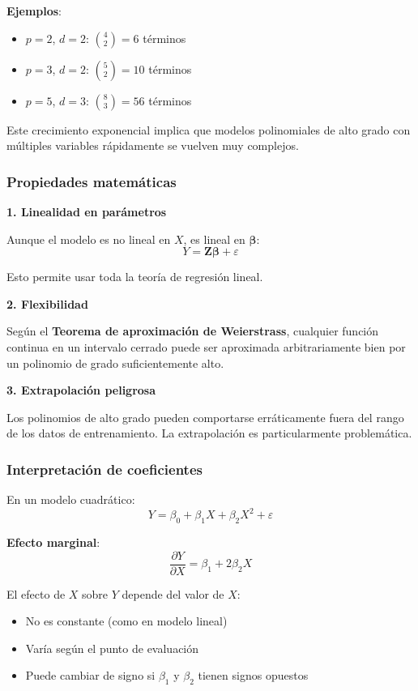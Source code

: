 \documentclass[
  doc,
  floatsintext,
  longtable,
  a4paper,
  nolmodern,
  notxfonts,
  notimes,
  12pt,
  colorlinks=true,linkcolor=blue,citecolor=blue,urlcolor=blue]{apa7}
\providecommand{\tightlist}{%
  \setlength{\itemsep}{0pt}\setlength{\parskip}{0pt}}
\begin{document}
\textbf{Ejemplos}:

\begin{itemize}
\tightlist
\item
  \(p=2\), \(d=2\): \(\binom{4}{2} = 6\) términos
\item
  \(p=3\), \(d=2\): \(\binom{5}{2} = 10\) términos\\
\item
  \(p=5\), \(d=3\): \(\binom{8}{3} = 56\) términos
\end{itemize}

Este crecimiento exponencial implica que modelos polinomiales de alto
grado con múltiples variables rápidamente se vuelven muy complejos.

\subsubsection{Propiedades
matemáticas}\label{propiedades-matemuxe1ticas}

\textbf{1. Linealidad en parámetros}

Aunque el modelo es no lineal en \(X\), es lineal en
\(\boldsymbol{\beta}\): \[
Y = \mathbf{Z}\boldsymbol{\beta} + \varepsilon
\]

Esto permite usar toda la teoría de regresión lineal.

\textbf{2. Flexibilidad}

Según el \textbf{Teorema de aproximación de Weierstrass}, cualquier
función continua en un intervalo cerrado puede ser aproximada
arbitrariamente bien por un polinomio de grado suficientemente alto.

\textbf{3. Extrapolación peligrosa}

Los polinomios de alto grado pueden comportarse erráticamente fuera del
rango de los datos de entrenamiento. La extrapolación es particularmente
problemática.

\subsubsection{Interpretación de
coeficientes}\label{interpretaciuxf3n-de-coeficientes}

En un modelo cuadrático: \[
Y = \beta_0 + \beta_1 X + \beta_2 X^2 + \varepsilon
\]

\textbf{Efecto marginal}: \[
\frac{\partial Y}{\partial X} = \beta_1 + 2\beta_2 X
\]

El efecto de \(X\) sobre \(Y\) depende del valor de \(X\):

\begin{itemize}
\tightlist
\item
  No es constante (como en modelo lineal)
\item
  Varía según el punto de evaluación
\item
  Puede cambiar de signo si \(\beta_1\) y \(\beta_2\) tienen signos
  opuestos
\end{itemize}
\end{document}
